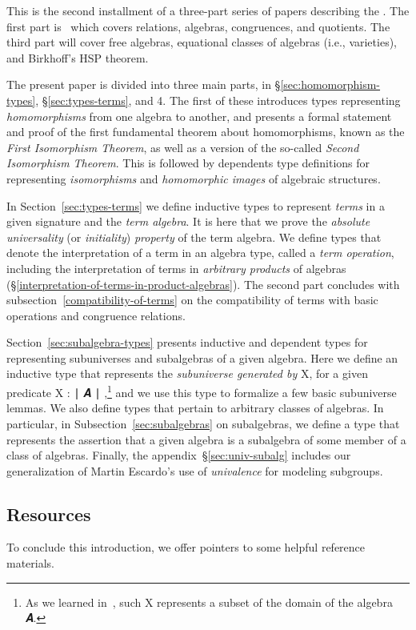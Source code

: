 This is the second installment of a three-part series of papers describing the \agdaualib. The first part is~\cite{DeMeo:2021-1} which covers relations, algebras, congruences, and quotients. The third part will cover free algebras, equational classes of algebras (i.e., varieties), and Birkhoff's HSP theorem.

The present paper is divided into three main parts, in \S\ref{sec:homomorphism-types}, \S\ref{sec:types-terms}, and 4.  The first of these introduces types representing \emph{homomorphisms} from one algebra to another, and presents a formal statement and proof of the first fundamental theorem about homomorphisms, known as the \emph{First Isomorphism Theorem}, as well as a version of the so-called \emph{Second Isomorphism Theorem}. This is followed by dependents type definitions for representing \emph{isomorphisms} and \emph{homomorphic images} of algebraic structures.

In Section~\ref{sec:types-terms} we define inductive types to represent \emph{terms} in a given signature and the \emph{term algebra}. It is here that we prove the \emph{absolute universality} (or \emph{initiality}) \emph{property} of the term algebra.  We define types that denote the interpretation of a term in an algebra type, called a \emph{term operation}, including the interpretation of terms in \emph{arbitrary products} of algebras (\S\ref{interpretation-of-terms-in-product-algebras}). The second part concludes with subsection~\ref{compatibility-of-terms} on the compatibility of terms with basic operations and congruence relations.

Section~\ref{sec:subalgebra-types} presents inductive and dependent types for representing subuniverses and subalgebras of a given algebra. Here we define an inductive type that represents the \emph{subuniverse generated by} \ab X, for a given predicate \ab X \as :  \af ∣ \ab 𝑨 \af ∣ \AgdaUnderscore,\footnote{As we learned in~\cite{DeMeo:2021-1}, such \ab X represents a subset of the domain of the algebra \ab 𝑨.} and we use this type to formalize a few basic subuniverse lemmas.  We also define types that pertain to arbitrary classes of algebras. In particular, in Subsection~\ref{sec:subalgebras} on subalgebras, we define a type that represents the assertion that a given algebra is a subalgebra of some member of a class of algebras.  Finally, the appendix~\S\ref{sec:univ-subalg} includes our generalization of Martin Escardo's use of \emph{univalence} for modeling subgroups.

\subsection{Resources}
To conclude this introduction, we offer pointers to some helpful reference materials.




